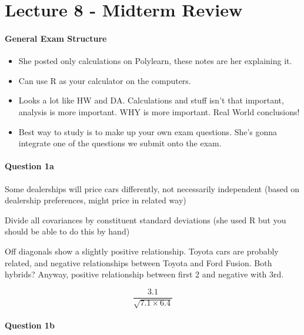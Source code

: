 \hypertarget{lecture-8---midterm-review}{%
\chapter{Lecture 8 - Midterm Review}\label{lecture-8---midterm-review}}

\hypertarget{general-exam-structure}{%
\subsubsection{General Exam Structure}\label{general-exam-structure}}

\begin{itemize}
\tightlist
\item
  She posted only calculations on Polylearn, these notes are her
  explaining it.
\item
  Can use R as your calculator on the computers.
\item
  Looks a lot like HW and DA. Calculations and stuff isn't that
  important, analysis is more important. WHY is more important. Real
  World conclusions!
\item
  Best way to study is to make up your own exam questions. She's gonna
  integrate one of the questions we submit onto the exam.
\end{itemize}

\hypertarget{question-1a}{%
\subsubsection{Question 1a}\label{question-1a}}

Some dealerships will price cars differently, not necessarily
independent (based on dealership preferences, might price in related
way)

Divide all covariances by constituent standard deviations (she used R
but you should be able to do this by hand)

Off diagonals show a slightly positive relationship. Toyota cars are
probably related, and negative relationships between Toyota and Ford
Fusion. Both hybrids? Anyway, positive relationship between first 2 and
negative with 3rd.

\[ \frac{3.1}{ \sqrt{7.1 \times 6.4}} \]

\hypertarget{question-1b}{%
\subsubsection{Question 1b}\label{question-1b}}

